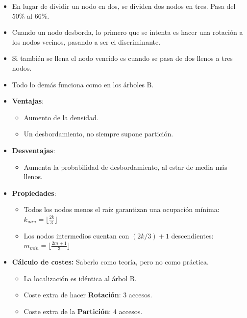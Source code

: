 \documentclass[12pt, twoside, openright]{report} %
\begin{document}
  \begin{itemize}
  \item En lugar de dividir un nodo en dos, se dividen dos nodos en tres.
    Pasa del 50\% al 66\%.
    
  \item Cuando un nodo desborda, lo primero que se intenta es hacer una
    rotación a los nodos vecinos, pasando a ser el discriminante.
    
  \item Si también se llena el nodo vencido es cuando se pasa de dos llenos
    a tres nodos.
    
  \item Todo lo demás funciona como en los árboles B.
    
  \item \textbf{Ventajas}:
    

    \begin{itemize}
    \item Aumento de la densidad.
      
    \item Un desbordamiento, no siempre supone partición.
      
    \end{itemize}
  \item \textbf{Desventajas}:
    

    \begin{itemize}
    \item Aumenta la probabilidad de desbordamiento, al estar de media más
      llenos.
      
    \end{itemize}
	\pagebreak
  \item \textbf{Propiedades}:
    

    \begin{itemize}
    \item Todos los nodos menos el raíz garantizan una ocupación mínima:
      $k_{min} = \lfloor \frac{2k}{3} \rfloor$
      
    \item Los nodos intermedios cuentan con $(2k/3) +1$ descendientes: 
    $m_{min} = \lfloor \frac{2m+1}{3} \rfloor$
      
    \end{itemize}
  \item \textbf{Cálculo de costes:} Saberlo como teoría, pero no como
    práctica.
    

    \begin{itemize}
    \item La localización es idéntica al árbol B.
      
    \item Coste extra de hacer \textbf{Rotación}: 3 accesos.
      
    \item Coste extra de la \textbf{Partición}: 4 accesos.
      
    \end{itemize}
  \end{itemize}
\end{document}
